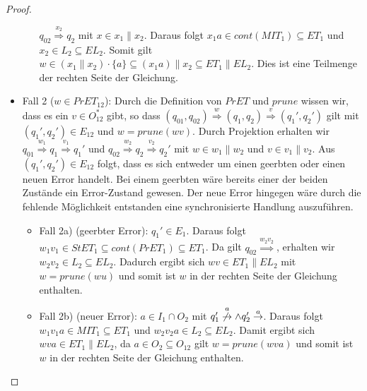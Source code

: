 \begin{proof}
\begin{itemize}
\begin{itemize}
      $q_{02}\overset{x_2}{\Rightarrow} q_2$ mit $x\in x_1\|x_2$. Daraus folgt
      $x_1a\in cont(MIT_1)\subseteq ET_1$ und $x_2\in L_2\subseteq EL_2$. Somit
      gilt $w\in (x_1\| x_2)\cdot\{a\}\subseteq (x_1a)\|x_2\subseteq ET_1\|EL_2$.
      Dies ist eine Teilmenge der rechten Seite der Gleichung.
  \end{itemize}
    \item Fall 2 ($w\in PrET_{12}$): Durch die Definition von $PrET$ und $prune$
      wissen wir, dass es ein $v\in O_{12}^*$ gibt, so dass $(q_{01},q_{02})
      \overset{w}{\Rightarrow} (q_1,q_2) \overset{v}{\Rightarrow} (q_1',q_2')$
      gilt mit $(q_1',q_2')\in E_{12}$ und $w=prune(wv)$. Durch Projektion
      erhalten wir $q_{01} \overset{w_1}{\Rightarrow} q_1
      \overset{v_1}{\Rightarrow} q_1'$ und $q_{02} \overset{w_2}{\Rightarrow}
      q_2 \overset{v_2}{\Rightarrow} q_2'$ mit $w\in w_1\|w_2$ und $v\in
      v_1\|v_2$. Aus $(q_1',q_2')\in E_{12}$ folgt, dass es sich entweder um
      einen geerbten oder einen neuen Error handelt. Bei einem geerbten wäre
      bereits einer der beiden Zustände ein Error-Zustand gewesen. Der neue
      Error hingegen wäre durch die fehlende Möglichkeit
      entstanden eine synchronisierte Handlung auszuführen.
      \begin{itemize}
        \item Fall 2a) (geerbter Error): \OBdA{} $q_1'\in E_1$. Daraus folgt
          $w_1v_1\in StET_1\subseteq cont(PrET_1)\subseteq ET_1$. Da gilt
          $q_{02}\overset{w_2v_2}{\Rightarrow}$, erhalten wir $w_2v_2\in
          L_2\subseteq EL_2$. Dadurch ergibt sich $wv\in ET_1\|EL_2$ mit
          $w=prune(wu)$ und somit ist $w$ in der rechten Seite der Gleichung
          enthalten.
        \item Fall 2b) (neuer Error): \OBdA{} $a\in I_1\cap O_2$ mit
          $q_1'\overset{a}{\not{\hspace{-0.1cm}\rightarrow}} \wedge q_2'
          \overset{a}{\rightarrow}$. Daraus folgt $w_1v_1a\in MIT_1\subseteq
          ET_1$ und $w_2v_2a\in L_2\subseteq EL_2$. Damit ergibt sich $wva\in
          ET_1\|EL_2$, da $a\in O_2\subseteq O_{12}$ gilt $w=prune(wva)$ und
          somit ist $w$ in der rechten Seite der Gleichung enthalten.
      \end{itemize}
  \end{itemize}


\end{proof}
